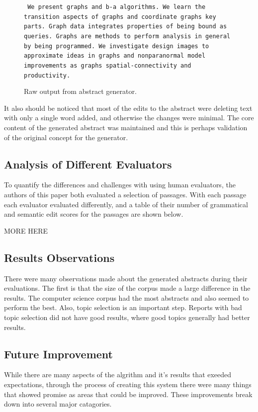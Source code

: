 \documentclass[letterpaper, 10 pt, conference]{ieeeconf}  %
\begin{document}
{
\noindent
\begin{figure}[!ht]
\small
\texttt{ We present graphs and b-a algorithms. We learn the transition aspects of graphs and coordinate graphs key parts. Graph data integrates properties of being bound as queries. Graphs are methods to perform analysis in general by being programmed. We investigate design images to approximate ideas in graphs and nonparanormal model improvements as graphs spatial-connectivity and productivity.}
\caption{Raw output from abstract generator.}
\label{fig:example_output_grammar_two}
\end{figure}
\normalsize
}


It also should be noticed that most of the edits to the abstract were deleting text with only a single word added, and otherwise the changes were minimal. The core content of the generated abstract was maintained and this is perhaps validation of the original concept for the generator.

\subsection{Analysis of Different Evaluators}

To quantify the differences and challenges with using human evaluators, the authors of this paper both evaluated a selection of passages. With each passage each evaluator evaluated differently, and a table of their number of grammatical and semantic edit scores for the passages are shown below.

MORE HERE

\subsection{Results Observations}

There were many observations made about the generated abstracts during their evaluations. The first is that the size of the corpus made a large difference in the results. The computer science corpus had the most abstracts and also seemed to perform the best. Also, topic selection is an important step. Reports with bad topic selection did not have good results, where good topics generally had better results.

\subsection{Future Improvement}

While there are many aspects of the algrithm and it's results that exeeded expectations, through the process of creating this system there were many things that showed promise as areas that could be improved. These improvements break down into several major catagories.
\end{document}
